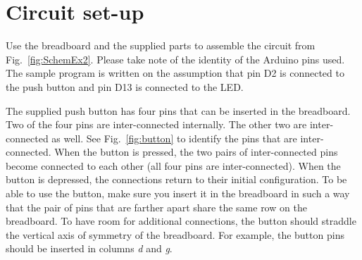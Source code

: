 \documentclass[12pt]{book}
\begin{document}
\section{Circuit set-up}\label{se:setup2}

Use the breadboard and the supplied parts to assemble the circuit from
Fig.~\ref{fig:SchemEx2}. Please take note of the identity of the Arduino
pins used. The sample program is written on the assumption that pin D2
is connected to the push button and pin D13 is connected to the LED.

The supplied push button has four pins that can be inserted in the
breadboard. Two of the four pins are inter-connected internally. The
other two are inter-connected as well. See Fig.~\ref{fig:button} to identify
the pins that are inter-connected.  When the button
is pressed, the two pairs of inter-connected pins become connected to
each other (all four pins are inter-connected). When the
button is depressed, the connections return to their initial
configuration. To be able to use the button, make sure you insert it
in the breadboard in such a way that the pair of pins that are farther
apart share the same row on the breadboard. To have room for
additional connections, the button should straddle the vertical axis
of symmetry of the breadboard. For example, the button pins should
be inserted in columns \emph{d} and \emph{g}. 
\end{document}
